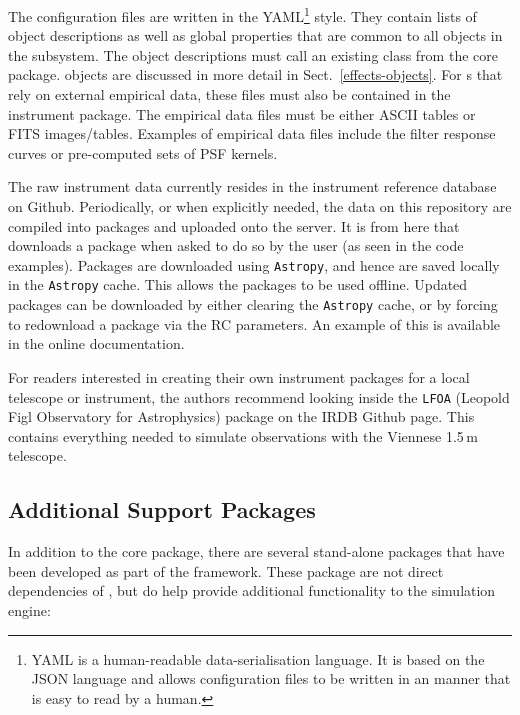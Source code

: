The configuration files are written in the YAML\footnote{YAML is a
  human-readable data-serialisation language. It is based on the JSON
  language and allows configuration files to be written in an manner
  that is easy to read by a human.} style.  They contain lists of
\Effect{} object descriptions as well as global properties that are
common to all \Effect{} objects in the subsystem.  The \Effect{}
object descriptions must call an existing \Effect{} class from the
\ScopeSim{} core package.  \Effect{} objects are discussed in more
detail in Sect.~\ref{effects-objects}.  For \Effect{}s that rely on
external empirical data, these files must also be contained in the
instrument package.  The empirical data files must be either ASCII
tables or FITS images/tables.  Examples of empirical data files
include the filter response curves or pre-computed sets of PSF
kernels.

The raw instrument data currently resides in the instrument reference
database on Github.  Periodically, or when explicitly needed, the data
on this repository are compiled into packages and uploaded onto the
\ScopeSim{} server.  It is from here that \ScopeSim{} downloads a
package when asked to do so by the user (as seen in the code
examples).  Packages are downloaded using \lstinline{Astropy}, and
hence are saved locally in the \lstinline{Astropy} cache.  This allows
the packages to be used offline.  Updated packages can be downloaded
by either clearing the \lstinline{Astropy} cache, or by forcing
\scopesim{} to redownload a package via the RC parameters.  An example
of this is available in the online documentation.

For readers interested in creating their own instrument packages for a
local telescope or instrument, the authors recommend looking inside
the \lstinline{LFOA} (Leopold Figl Observatory for Astrophysics)
package on the IRDB Github page.  This contains everything needed to
simulate observations with the Viennese 1.5\,m telescope.



\subsection{Additional Support Packages}
\label{support-packages}

In addition to the core package, there are several stand-alone
packages that have been developed as part of the \ScopeSim{}
framework.  These package are not direct dependencies of \ScopeSim{},
but do help provide additional functionality to the simulation engine:


